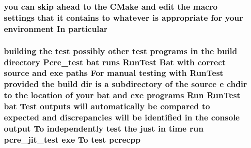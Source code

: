 \subsubsection[{\texorpdfstring{particular}{particular}}]{\setlength{\rightskip}{0pt plus 5cm}you {\bf can} {\bf skip} ahead {\bf to} the C\+Make and edit the macro settings that {\bf it} {\bf contains} {\bf to} whatever {\bf is} appropriate for your {\bf environment} In particular}\hypertarget{NON-AUTOTOOLS-BUILD_8txt_a3c02a02d50de6dbbd8fbcbb975490cfb}{}\label{NON-AUTOTOOLS-BUILD_8txt_a3c02a02d50de6dbbd8fbcbb975490cfb}
\subsubsection[{\texorpdfstring{pcrecpp}{pcrecpp}}]{\setlength{\rightskip}{0pt plus 5cm}building the test possibly other test programs {\bf in} the build {\bf directory} Pcre\+\_\+test {\bf bat} runs Run\+Test Bat {\bf with} correct {\bf source} and {\bf exe} paths For manual testing {\bf with} Run\+Test provided the build {\bf dir} {\bf is} {\bf a} subdirectory {\bf of} the {\bf source} {\bf e} chdir {\bf to} the {\bf location} {\bf of} your {\bf bat} and {\bf exe} programs Run Run\+Test {\bf bat} Test outputs will automatically {\bf be} compared {\bf to} {\bf expected} and discrepancies will {\bf be} identified {\bf in} the console {\bf output} To independently test the just {\bf in} {\bf time} {\bf run} pcre\+\_\+jit\+\_\+test {\bf exe} To test pcrecpp}\hypertarget{NON-AUTOTOOLS-BUILD_8txt_a65a9dd8ea1068a5a96ffaa4dc5478e6e}{}\label{NON-AUTOTOOLS-BUILD_8txt_a65a9dd8ea1068a5a96ffaa4dc5478e6e}
